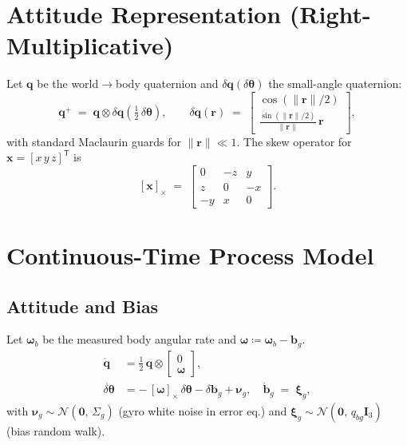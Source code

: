 \documentclass[11pt]{article}
\newcommand{\vect}[1]{\bm{#1}}
\newcommand{\mat}[1]{\bm{#1}}
\newcommand{\quat}[1]{\mathbf{#1}}
\newcommand{\T}{\mathsf{T}}
\newcommand{\I}{\mat{I}}
\newcommand{\skew}[1]{\left[ #1 \right]_\times}
\begin{document}
\section{Attitude Representation (Right-Multiplicative)}
\label{sec:attitude}
Let \(\quat{q}\) be the world\(\to\)body quaternion and
\(\delta\quat{q}(\delta\vect{\theta})\) the small-angle quaternion:
\begin{equation}
  \quat{q}^+ \;=\; \quat{q}\otimes \delta\quat{q}\!\left(\tfrac12\,\delta\vect{\theta}\right), 
  \qquad
  \delta\quat{q}(\vect{r}) \;=\;
  \begin{bmatrix}
    \cos(\|\vect{r}\|/2)\\
    \frac{\sin(\|\vect{r}\|/2)}{\|\vect{r}\|}\,\vect{r}
  \end{bmatrix},
  \label{eq:quat-update}
\end{equation}
with standard Maclaurin guards for \(\|\vect{r}\|\ll 1\).
The skew operator for \(\vect{x}=[x\,y\,z]^\T\) is
\begin{equation}
  \skew{\vect{x}} \;=\;
  \begin{bmatrix}
    0 & -z & y\\ z & 0 & -x\\ -y & x & 0
  \end{bmatrix}.
  \label{eq:skew}
\end{equation}

\section{Continuous-Time Process Model}
\label{sec:ct-model}
\subsection{Attitude and Bias}
Let \(\vect{\omega}_b\) be the measured body angular rate and
\(\vect{\omega} \coloneqq \vect{\omega}_b - \vect{b}_g\).
\begin{align}
  \dot{\quat{q}} &= \tfrac12\, \quat{q} \otimes \begin{bmatrix} 0 \\ \vect{\omega} \end{bmatrix},
  \label{eq:qdot}\\
  \dot{\delta\vect{\theta}} &= -\,\skew{\vect{\omega}}\,\delta\vect{\theta} - \delta\vect{b}_g + \vect{\nu}_g,
  \quad
  \dot{\vect{b}}_g \;=\; \vect{\xi}_g,
  \label{eq:theta-bg-ct}
\end{align}
with \(\vect{\nu}_g\sim\mathcal{N}(\vect{0},\,\Sigma_g)\) (gyro white noise in error eq.) and
\(\vect{\xi}_g\sim\mathcal{N}(\vect{0},\,q_{bg}\I_3)\) (bias random walk).
\end{document}
